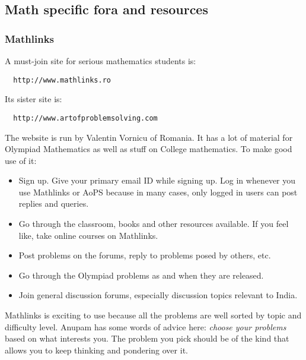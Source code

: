 \documentclass[a4paper]{amsart}
\begin{document}

\subsection{Math specific fora and resources}

\subsubsection{Mathlinks}

A must-join site for serious mathematics students is:

\begin{verbatim}
  http://www.mathlinks.ro
\end{verbatim}

Its sister site is:

\begin{verbatim}
  http://www.artofproblemsolving.com
\end{verbatim}

The website is run by Valentin Vornicu of Romania. It has a lot of material for Olympiad Mathematics as well as stuff on College
mathematics.  To make good use of it:

\begin{itemize}

\item Sign up. Give your primary email ID while signing up. Log in whenever you use Mathlinks or AoPS because in many cases, only
  logged in users can post replies and queries.

\item Go through the classroom, books and other resources available. If you feel like, take online courses on Mathlinks.

\item Post problems on the forums, reply to problems posed by others, etc.

\item Go through the Olympiad problems as and when they are released.

\item Join general discussion forums, especially discussion topics relevant to India.

\end{itemize}

Mathlinks is exciting to use because all the problems are well sorted by topic and difficulty level. Anupam has some words
of advice here: {\em choose your problems} based on what interests you. The problem you pick should be of the kind that allows you to
keep thinking and pondering over it.
\end{document}
